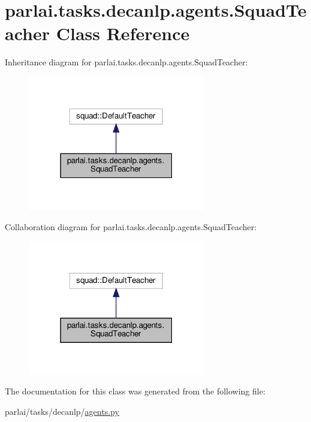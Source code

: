 \hypertarget{classparlai_1_1tasks_1_1decanlp_1_1agents_1_1SquadTeacher}{}\section{parlai.\+tasks.\+decanlp.\+agents.\+Squad\+Teacher Class Reference}
\label{classparlai_1_1tasks_1_1decanlp_1_1agents_1_1SquadTeacher}


Inheritance diagram for parlai.\+tasks.\+decanlp.\+agents.\+Squad\+Teacher\+:
\nopagebreak
\begin{figure}[H]
\begin{center}
\leavevmode
\includegraphics[width=219pt]{classparlai_1_1tasks_1_1decanlp_1_1agents_1_1SquadTeacher__inherit__graph}
\end{center}
\end{figure}


Collaboration diagram for parlai.\+tasks.\+decanlp.\+agents.\+Squad\+Teacher\+:
\nopagebreak
\begin{figure}[H]
\begin{center}
\leavevmode
\includegraphics[width=219pt]{classparlai_1_1tasks_1_1decanlp_1_1agents_1_1SquadTeacher__coll__graph}
\end{center}
\end{figure}


The documentation for this class was generated from the following file\+:\begin{DoxyCompactItemize}
\item 
parlai/tasks/decanlp/\hyperlink{parlai_2tasks_2decanlp_2agents_8py}{agents.\+py}\end{DoxyCompactItemize}
